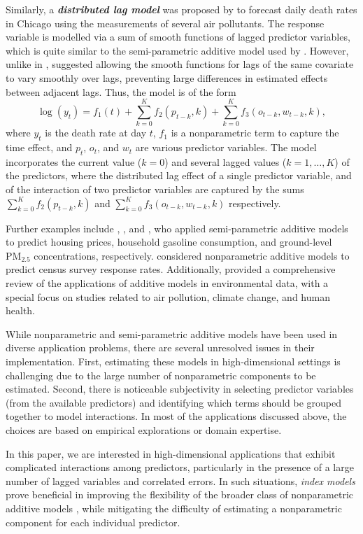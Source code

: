 \documentclass[
  11pt,
  a4paper,
]{article}
\begin{document}
Similarly, a \textbf{\emph{distributed lag model}} was proposed by
\textcite{Wood2017} to forecast daily death rates in Chicago using the
measurements of several air pollutants. The response variable is
modelled via a sum of smooth functions of lagged predictor variables,
which is quite similar to the semi-parametric additive model used by
\textcite{FH2012}. However, unlike in \textcite{FH2012},
\textcite{Wood2017} suggested allowing the smooth functions for lags of
the same covariate to vary smoothly over lags, preventing large
differences in estimated effects between adjacent lags. Thus, the model
is of the form \[
 \log(y_{t}) = f_{1}(t) + \sum_{k=0}^{K} f_{2}(p_{t-k}, k) + \sum_{k=0}^{K} f_{3}(o_{t-k}, w_{t-k}, k),
\] where \(y_{t}\) is the death rate at day \(t\), \(f_{1}\) is a
nonparametric term to capture the time effect, and \(p_t\), \(o_t\), and
\(w_t\) are various predictor variables. The model incorporates the
current value (\(k = 0\)) and several lagged values
(\(k = 1, \dots, K\)) of the predictors, where the distributed lag
effect of a single predictor variable, and of the interaction of two
predictor variables are captured by the sums
\(\sum_{k=0}^{K} f_{2}(p_{t-k}, k)\) and
\(\sum_{k=0}^{K} f_{3}(o_{t-k}, w_{t-k}, k)\) respectively.

Further examples include \textcite{Boente2023}, \textcite{Du2012}, and
\textcite{Ho2020}, who applied semi-parametric additive models to
predict housing prices, household gasoline consumption, and ground-level
\(\text{PM}_{2.5}\) concentrations, respectively. \textcite{Ibrahim2023}
considered nonparametric additive models to predict census survey
response rates. Additionally, \textcite{Ravindra2019} provided a
comprehensive review of the applications of additive models in
environmental data, with a special focus on studies related to air
pollution, climate change, and human health.

While nonparametric and semi-parametric additive models have been used
in diverse application problems, there are several unresolved issues in
their implementation. First, estimating these models in high-dimensional
settings is challenging due to the large number of nonparametric
components to be estimated. Second, there is noticeable subjectivity in
selecting predictor variables (from the available predictors) and
identifying which terms should be grouped together to model
interactions. In most of the applications discussed above, the choices
are based on empirical explorations or domain expertise.

In this paper, we are interested in high-dimensional applications that
exhibit complicated interactions among predictors, particularly in the
presence of a large number of lagged variables and correlated errors. In
such situations, \emph{index models} prove beneficial in improving the
flexibility of the broader class of nonparametric additive models
\autocite{Radchenko2015}, while mitigating the difficulty of estimating
a nonparametric component for each individual predictor.
\end{document}
